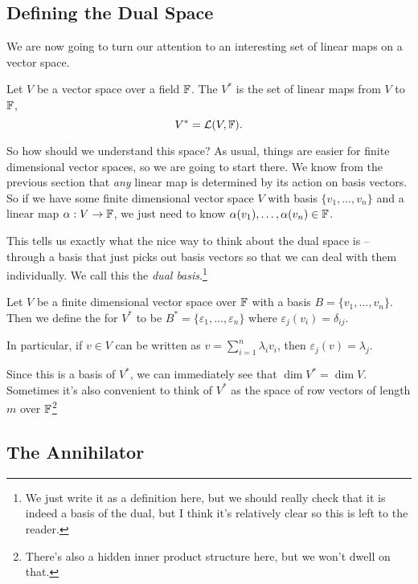 \documentclass[a4paper]{scrartcl}
\begin{document}
\subsection{Defining the Dual Space}

We are now going to turn our attention to an interesting set of linear maps on a vector space.

\begin{definition}
    Let $V$ be a vector space over a field $\mathbb{F}$. The  $V^*$ is the set of linear maps from $V$ to $\mathbb{F}$,
    $$
    V^* = \mathcal{L}(V, \mathbb{F}).
    $$
\end{definition}

So how should we understand this space?
As usual, things are easier for finite dimensional vector spaces, so we are going to start there. We know from the previous section that \emph{any} linear map is determined by its action on basis vectors. So if we have some finite dimensional vector space $V$ with basis $\{v_1, \dots, v_n\}$ and a linear map $\alpha: V \rightarrow \mathbb{F}$, we just need to know $\alpha(v_1), \dots, \alpha(v_n) \in \mathbb{F}$.

This tells us exactly what the nice way to think about the dual space is -- through a basis that just picks out basis vectors so that we can deal with them individually. We call this the \emph{dual basis}.\footnote{We just write it as a definition here, but we should really check that it is indeed a basis of the dual, but I think it's relatively clear so this is left to the reader.}

\begin{definition}
    Let $V$ be a finite dimensional vector space over $\mathbb{F}$ with a basis $B = \{v_1, \dots, v_n\}$. 
    Then we define the  for $V^*$ to be $B^* = \{\varepsilon_1, \dots, \varepsilon_n\}$ where $\varepsilon_j(v_i) = \delta_{ij}$.

    In particular, if $v \in V$ can be written as $v = \sum_{i = 1}^n \lambda_i v_i$, then $\varepsilon_j(v) = \lambda_j$.
\end{definition}

Since this is a basis of $V^*$, we can immediately see that $\dim V^* = \dim V$. Sometimes it's also convenient to think of $V^*$ as the space of row vectors of length $m$ over $\mathbb{F}$\footnote{There's also a hidden inner product structure here, but we won't dwell on that.}

\subsection{The Annihilator}
\end{document}
